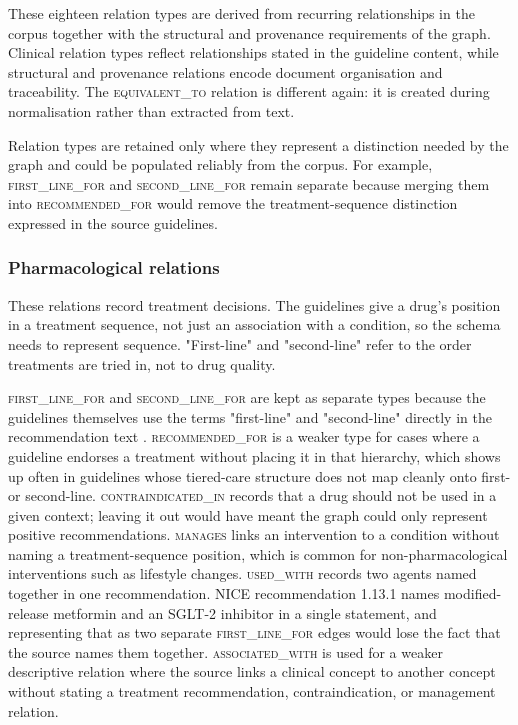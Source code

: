 These eighteen relation types are derived from recurring relationships
in the corpus together with the structural and provenance requirements
of the graph. Clinical relation types reflect relationships stated in
the guideline content, while structural and provenance relations encode
document organisation and traceability. The
\textsc{equivalent\_to} relation is different again: it is created
during normalisation rather than extracted from text.

Relation types are retained only where they represent a distinction
needed by the graph and could be populated reliably from the corpus. For
example, \textsc{first\_line\_for} and \textsc{second\_line\_for} remain
separate because merging them into \textsc{recommended\_for} would remove
the treatment-sequence distinction expressed in the source guidelines.

\subsubsection{Pharmacological relations}
These relations record treatment decisions. The guidelines give a drug's position in a treatment sequence, not just an association with a condition, so the schema needs to represent sequence. "First-line" and "second-line" refer to the order treatments are tried in, not to drug quality.

\textsc{first\_line\_for} and \textsc{second\_line\_for} are kept as separate types because the guidelines themselves use the terms "first-line" and "second-line" directly in the recommendation text \cite{NICE_T2_2026}. \textsc{recommended\_for} is a weaker type for cases where a guideline endorses a treatment without placing it in that hierarchy, which shows up often in guidelines whose tiered-care structure does not map cleanly onto first- or second-line. \textsc{contraindicated\_in} records that a drug should not be used in a given context; leaving it out would have meant the graph could only represent positive recommendations. \textsc{manages} links an intervention to a condition without naming a treatment-sequence position, which is common for non-pharmacological interventions such as lifestyle changes. \textsc{used\_with} records two agents named together in one recommendation. NICE recommendation 1.13.1 \cite{NICE_T2_2026} names modified-release metformin and an SGLT-2 inhibitor in a single statement, and representing that as two separate \textsc{first\_line\_for} edges would lose the fact that the source names them together. \textsc{associated\_with} is used for a weaker descriptive relation where
the source links a clinical concept to another concept without stating a
treatment recommendation, contraindication, or management relation.


